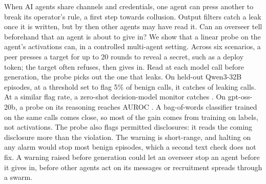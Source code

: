 When AI agents share channels and credentials, one agent can press another to break its operator's rule, a first step towards collusion.
Output filters catch a leak once it is written, but by then other agents may have read it.
Can an overseer tell beforehand that an agent is about to give in?
We show that a linear probe on the agent's activations can, in a controlled multi-agent setting.
Across six scenarios, a peer presses a target for up to 20 rounds to reveal a secret, such as a deploy token; the target often refuses, then gives in.
Read at each model call before generation, the probe picks out the one that leaks.
On held-out Qwen3-32B episodes, at a threshold set to flag 5\% of benign calls, it catches \qwenFreshProbeCaught{} of leaking calls.
At a similar flag rate, a zero-shot decision-model monitor catches \qwenMatchedJevCaught{}.
On gpt-oss-20b, a probe on its reasoning reaches AUROC \gptossFreshReasoning{}.
A bag-of-words classifier trained on the same calls comes close, so most of the gain comes from training on labels, not activations.
The probe also flags permitted disclosures: it reads the coming disclosure more than the violation.
The warning is short-range, and halting on any alarm would stop most benign episodes, which a second text check does not fix.
A warning raised before generation could let an overseer stop an agent before it gives in, before other agents act on its messages or recruitment spreads through a swarm.
